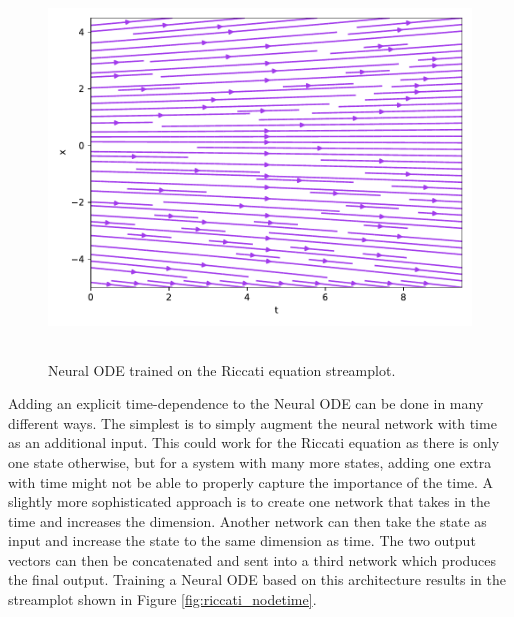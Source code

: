 \documentclass[12pt,a4paper]{book}
\begin{document}
\begin{figure}[H]
    \centering
    \includegraphics[height=10cm]{figs/riccati_node.pdf}
    \caption{Neural ODE trained on the Riccati equation streamplot.}
    \label{fig:riccati_node}
\end{figure}

Adding an explicit time-dependence to the Neural ODE can be done in many different ways. The simplest is to simply augment the neural network with time as an additional input. This could work for the Riccati equation as there is only one state otherwise, but for a system with many more states, adding one extra with time might not be able to properly capture the importance of the time. A slightly more sophisticated approach is to create one network that takes in the time and increases the dimension. Another network can then take the state as input and increase the state to the same dimension as time. The two output vectors can then be concatenated and sent into a third network which produces the final output. Training a Neural ODE based on this architecture results in the streamplot shown in Figure \ref{fig:riccati_nodetime}. 
\end{document}
